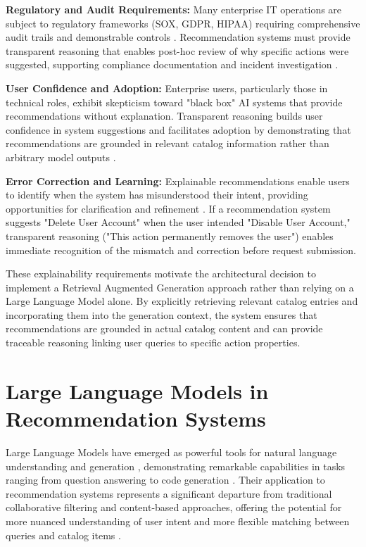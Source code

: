 \textbf{Regulatory and Audit Requirements:} Many enterprise IT operations are subject to regulatory frameworks (SOX, GDPR, HIPAA) requiring comprehensive audit trails and demonstrable controls \cite{madabhushini2025explainable}. Recommendation systems must provide transparent reasoning that enables post-hoc review of why specific actions were suggested, supporting compliance documentation and incident investigation \cite{madabhushini2025explainable}.

\textbf{User Confidence and Adoption:} Enterprise users, particularly those in technical roles, exhibit skepticism toward "black box" AI systems that provide recommendations without explanation. Transparent reasoning builds user confidence in system suggestions and facilitates adoption by demonstrating that recommendations are grounded in relevant catalog information rather than arbitrary model outputs \cite{madabhushini2025explainable}.

\textbf{Error Correction and Learning:} Explainable recommendations enable users to identify when the system has misunderstood their intent, providing opportunities for clarification and refinement \cite{madabhushini2025explainable}. If a recommendation system suggests "Delete User Account" when the user intended "Disable User Account," transparent reasoning ("This action permanently removes the user") enables immediate recognition of the mismatch and correction before request submission.

These explainability requirements motivate the architectural decision to implement a Retrieval Augmented Generation approach rather than relying on a Large Language Model alone. By explicitly retrieving relevant catalog entries and incorporating them into the generation context, the system ensures that recommendations are grounded in actual catalog content and can provide traceable reasoning linking user queries to specific action properties.

\section{Large Language Models in Recommendation Systems}

Large Language Models have emerged as powerful tools for natural language understanding and generation \cite{recommender_systems_llm}, demonstrating remarkable capabilities in tasks ranging from question answering to code generation \cite{recommender_systems_llm}. Their application to recommendation systems represents a significant departure from traditional collaborative filtering and content-based approaches, offering the potential for more nuanced understanding of user intent and more flexible matching between queries and catalog items \cite{recommender_systems_llm}.

